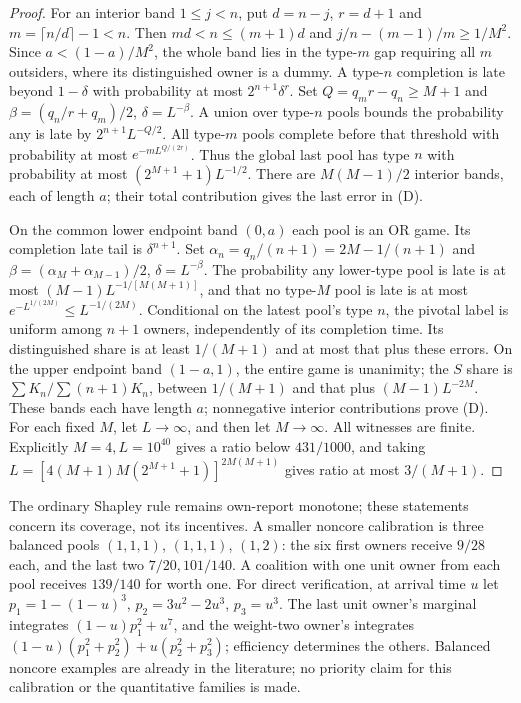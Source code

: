 \documentclass[11pt]{article}
\theoremstyle{definition}\newtheorem{definition}[theorem]{Definition}
\theoremstyle{remark}\newtheorem{remark}[theorem]{Remark}
\begin{document}
\begin{proof}
For an interior band $1\le j<n$, put $d=n-j$, $r=d+1$ and
$m=\lceil n/d\rceil-1<n$. Then $md<n\le(m+1)d$ and
$j/n-(m-1)/m\ge1/M^2$. Since $a<(1-a)/M^2$, the whole band lies in
the type-$m$ gap requiring all $m$ outsiders, where its distinguished owner
is a dummy. A type-$n$ completion is late beyond $1-\delta$ with probability
at most $2^{n+1}\delta^r$. Set
$Q=q_mr-q_n\ge M+1$ and $\beta=(q_n/r+q_m)/2$,
$\delta=L^{-\beta}$. A union over type-$n$ pools bounds the probability
any is late by $2^{n+1}L^{-Q/2}$. All type-$m$ pools complete before that
threshold with probability at most $e^{-mL^{Q/(2r)}}$.
Thus the global last pool has type $n$ with probability at most
$(2^{M+1}+1)L^{-1/2}$. There are $M(M-1)/2$ interior bands, each of
length $a$; their total contribution gives the last error in (D).

On the common lower endpoint band $(0,a)$ each pool is an OR game.
Its completion late tail is $\delta^{n+1}$. Set
$\alpha_n=q_n/(n+1)=2M-1/(n+1)$ and
$\beta=(\alpha_M+\alpha_{M-1})/2$, $\delta=L^{-\beta}$.
The probability any lower-type pool is late is at most
$(M-1)L^{-1/[M(M+1)]}$, and that no type-$M$ pool is late is at most
$e^{-L^{1/(2M)}}\le L^{-1/(2M)}$.
Conditional on the latest pool's type $n$, the pivotal label is uniform
among $n+1$ owners, independently of its completion time. Its distinguished
share is at least $1/(M+1)$ and at most that plus these errors.
On the upper endpoint band $(1-a,1)$, the entire game is unanimity; the
$S$ share is $\sum K_n/\sum(n+1)K_n$, between $1/(M+1)$ and that plus
$(M-1)L^{-2M}$. These bands each have length $a$; nonnegative interior
contributions prove (D). For each fixed $M$, let $L\to\infty$, and then
let $M\to\infty$. All witnesses are finite. Explicitly $M=4,L=10^{40}$
gives a ratio below $431/1000$, and taking
$L=[4(M+1)M(2^{M+1}+1)]^{2M(M+1)}$ gives ratio at most $3/(M+1)$.
\end{proof}
The ordinary Shapley rule remains own-report monotone; these statements
concern its coverage, not its incentives. A smaller noncore calibration is
three balanced pools $(1,1,1)$, $(1,1,1)$, $(1,2)$: the six first owners
receive $9/28$ each, and the last two $7/20,101/140$. A coalition with one
unit owner from each pool receives $139/140$ for worth one. For direct
verification, at arrival time $u$ let $p_1=1-(1-u)^3$, $p_2=3u^2-2u^3$,
$p_3=u^3$. The last unit owner's marginal integrates
$(1-u)p_1^2+u^7$, and the weight-two owner's integrates
$(1-u)(p_1^2+p_2^2)+u(p_2^2+p_3^2)$; efficiency determines the others.
Balanced noncore examples are already in the literature; no priority
claim for this calibration or the quantitative families is made.
\end{document}
